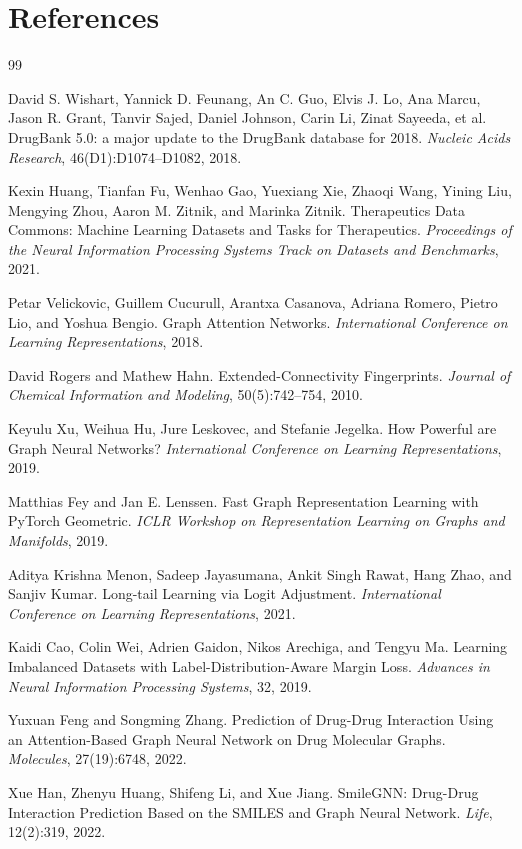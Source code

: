 \documentclass[12pt,a4paper]{report}
\begin{document}
\chapter*{References}
\begin{thebibliography}{99}

David S. Wishart, Yannick D. Feunang, An C. Guo, Elvis J. Lo, Ana Marcu, Jason R. Grant, Tanvir Sajed, Daniel Johnson, Carin Li, Zinat Sayeeda, et al.
\newblock DrugBank 5.0: a major update to the DrugBank database for 2018.
\newblock \emph{Nucleic Acids Research}, 46(D1):D1074--D1082, 2018.

Kexin Huang, Tianfan Fu, Wenhao Gao, Yuexiang Xie, Zhaoqi Wang, Yining Liu, Mengying Zhou, Aaron M. Zitnik, and Marinka Zitnik.
\newblock Therapeutics Data Commons: Machine Learning Datasets and Tasks for Therapeutics.
\newblock \emph{Proceedings of the Neural Information Processing Systems Track on Datasets and Benchmarks}, 2021.

Petar Velickovic, Guillem Cucurull, Arantxa Casanova, Adriana Romero, Pietro Lio, and Yoshua Bengio.
\newblock Graph Attention Networks.
\newblock \emph{International Conference on Learning Representations}, 2018.

David Rogers and Mathew Hahn.
\newblock Extended-Connectivity Fingerprints.
\newblock \emph{Journal of Chemical Information and Modeling}, 50(5):742--754, 2010.

Keyulu Xu, Weihua Hu, Jure Leskovec, and Stefanie Jegelka.
\newblock How Powerful are Graph Neural Networks?
\newblock \emph{International Conference on Learning Representations}, 2019.

Matthias Fey and Jan E. Lenssen.
\newblock Fast Graph Representation Learning with PyTorch Geometric.
\newblock \emph{ICLR Workshop on Representation Learning on Graphs and Manifolds}, 2019.

Aditya Krishna Menon, Sadeep Jayasumana, Ankit Singh Rawat, Hang Zhao, and Sanjiv Kumar.
\newblock Long-tail Learning via Logit Adjustment.
\newblock \emph{International Conference on Learning Representations}, 2021.

Kaidi Cao, Colin Wei, Adrien Gaidon, Nikos Arechiga, and Tengyu Ma.
\newblock Learning Imbalanced Datasets with Label-Distribution-Aware Margin Loss.
\newblock \emph{Advances in Neural Information Processing Systems}, 32, 2019.

Yuxuan Feng and Songming Zhang.
\newblock Prediction of Drug-Drug Interaction Using an Attention-Based Graph Neural Network on Drug Molecular Graphs.
\newblock \emph{Molecules}, 27(19):6748, 2022.

Xue Han, Zhenyu Huang, Shifeng Li, and Xue Jiang.
\newblock SmileGNN: Drug-Drug Interaction Prediction Based on the SMILES and Graph Neural Network.
\newblock \emph{Life}, 12(2):319, 2022.

\end{thebibliography}
\end{document}
